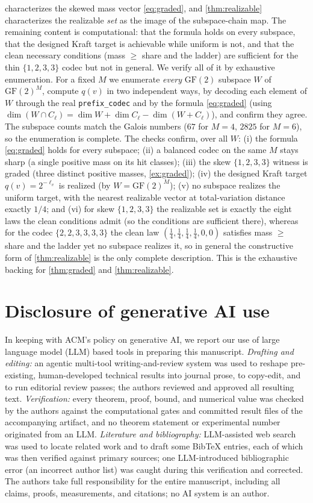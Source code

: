 \documentclass[acmsmall,review]{acmart}
\newcommand{\GF}{\mathrm{GF}(2)}
\newcommand{\W}{W}                          %
\newcommand{\inter}{\cap}
\begin{document}
 characterizes the skewed mass vector \eqref{eq:graded}, and
\cref{thm:realizable} characterizes the realizable \emph{set} as the image of the
subspace-chain map. The remaining content is computational: that the formula holds on every
subspace, that the designed Kraft target is achievable while uniform is not, and that the clean
necessary conditions (mass $\ge$ share and the ladder) are sufficient for the thin
$\{1,2,3,3\}$ codec but not in general. We verify all of it by exhaustive enumeration. For a fixed $M$ we enumerate \emph{every} $\GF$ subspace $\W$ of $\GF^M$, compute
$q(v)$ in two independent ways, by decoding each element of $\W$ through the real
\texttt{prefix\_codec} and by the formula \eqref{eq:graded} (using $\dim(\W \inter C_\ell) =
\dim \W + \dim C_\ell - \dim(\W + C_\ell)$), and confirm they agree. The subspace counts match
the Galois numbers ($67$ for $M = 4$, $2825$ for $M = 6$), so the enumeration is complete. The
checks confirm, over all $\W$: (i) the formula \eqref{eq:graded} holds for every subspace; (ii)
a balanced codec on the same $M$ stays sharp (a single positive mass on its hit classes); (iii)
the skew $\{1,2,3,3\}$ witness is graded (three distinct positive masses, \cref{ex:graded});
(iv) the designed Kraft target $q(v) = 2^{-\ell_v}$ is realized (by $\W = \GF^M$); (v) no
subspace realizes the uniform target, with the nearest realizable vector at total-variation
distance exactly $1/4$; and (vi) for skew $\{1,2,3,3\}$ the realizable set is exactly the eight
laws the clean conditions admit (so the conditions are sufficient there), whereas for the codec
$\{2,2,3,3,3,3\}$ the clean law $(\tfrac14,\tfrac14,\tfrac14,\tfrac14,0,0)$ satisfies mass
$\ge$ share and the ladder yet no subspace realizes it, so in general the constructive
form of \cref{thm:realizable} is the only complete description. This is the exhaustive backing
for \cref{thm:graded} and \cref{thm:realizable}.

\section*{Disclosure of generative AI use}
In keeping with ACM's policy on generative AI, we report our use of large language model
(LLM) based tools in preparing this manuscript. \emph{Drafting and editing:} an agentic
multi-tool writing-and-review system was used to reshape pre-existing, human-developed
technical results into journal prose, to copy-edit, and to run editorial review passes;
the authors reviewed and approved all resulting text. \emph{Verification:} every theorem,
proof, bound, and numerical value was checked by the authors against the computational gates
and committed result files of the accompanying artifact, and no theorem statement or
experimental number originated from an LLM. \emph{Literature and bibliography:} LLM-assisted
web search was used to locate related work and to draft some BibTeX entries, each of which
was then verified against primary sources; one LLM-introduced bibliographic error (an
incorrect author list) was caught during this verification and corrected. The authors take
full responsibility for the entire manuscript, including all claims, proofs, measurements,
and citations; no AI system is an author.



\end{document}

